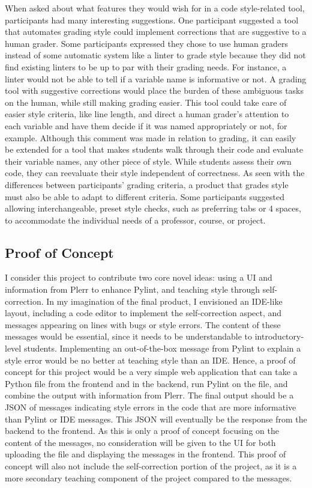\documentclass[10pt,twocolumn]{article}
\begin{document}
When asked about what features they would wish for in a code style-related tool, participants had many interesting suggestions. 
One participant suggested a tool that automates grading style could implement corrections that are suggestive to a human grader.
Some participants expressed they chose to use human graders instead of some automatic system like a linter to grade style because they did not find existing linters to be up to par with their grading needs. 
For instance, a linter would not be able to tell if a variable name is informative or not. 
A grading tool with suggestive corrections would place the burden of these ambiguous tasks on the human, while still making grading easier. 
This tool could take care of easier style criteria, like line length, and direct a human grader's attention to each variable and have them decide if it was named appropriately or not, for example. 
Although this comment was made in relation to grading, it can easily be extended for a tool that makes students walk through their code and evaluate their variable names, any other piece of style.
While students assess their own code, they can reevaluate their style independent of correctness. 
As seen with the differences between participants' grading criteria, a product that grades style must also be able to adapt to different criteria. 
Some participants suggested allowing interchangeable, preset style checks, such as preferring tabs or 4 spaces, to accommodate the individual needs of a professor, course, or project.

\subsection{Proof of Concept}
I consider this project to contribute two core novel ideas: using a UI and information from Plerr to enhance Pylint, and teaching style through self-correction. 
In my imagination of the final product, I envisioned an IDE-like layout, including a code editor to implement the self-correction aspect, and messages appearing on lines with bugs or style errors. 
The content of these messages would be essential, since it needs to be understandable to introductory-level students. 
Implementing an out-of-the-box message from Pylint to explain a style error would be no better at teaching style than an IDE. 
Hence, a proof of concept for this project would be a very simple web application that can take a Python file from the frontend and in the backend, run Pylint on the file, and combine the output with information from Plerr. 
The final output should be a JSON of messages indicating style errors in the code that are more informative than Pylint or IDE messages. 
This JSON will eventually be the response from the backend to the frontend.
As this is only a proof of concept focusing on the content of the messages, no consideration will be given to the UI for both uploading the file and displaying the messages in the frontend. 
This proof of concept will also not include the self-correction portion of the project, as it is a more secondary teaching component of the project compared to the messages. 
\end{document}
